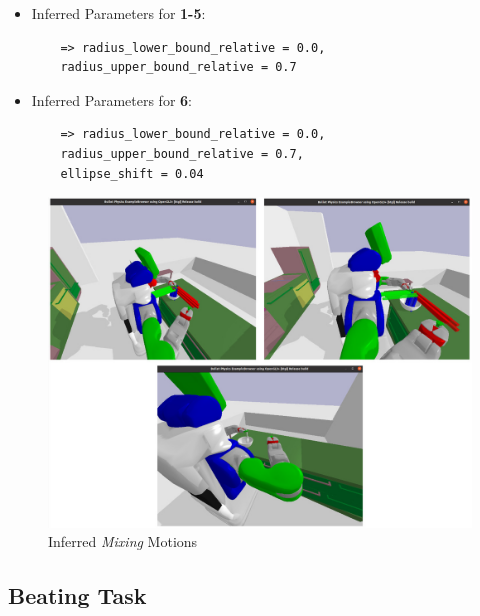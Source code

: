 \begin{itemize}
  \item Inferred Parameters for \textbf{1-5}: 
   \begin{lstlisting}
    => radius_lower_bound_relative = 0.0, 
    radius_upper_bound_relative = 0.7
  \end{lstlisting}
  \item Inferred Parameters for \textbf{6}:
  \begin{lstlisting}
    => radius_lower_bound_relative = 0.0, 
    radius_upper_bound_relative = 0.7,
    ellipse_shift = 0.04
  \end{lstlisting}
\end{itemize}

\begin{figure}[H]
  \includegraphics[scale=0.35]{Graphics/mixing_evaluation.jpg}
  \caption{Inferred \textit{Mixing} Motions}
  \label{fig:mixingverb WikiHow}
\end{figure}

\subsection*{Beating Task}

